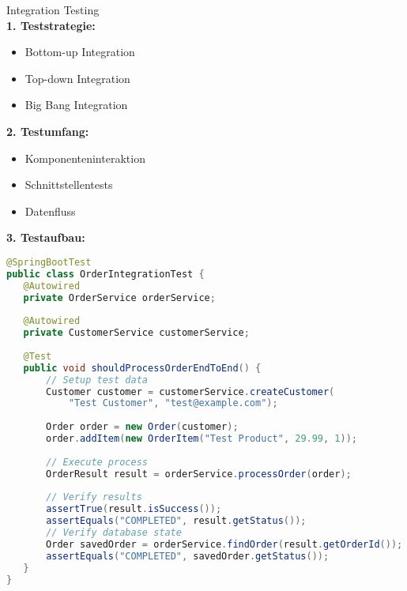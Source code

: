 \begin{KR}{Integration Testing}\\
\textbf{1. Teststrategie:}
\begin{itemize}
   \item Bottom-up Integration
   \item Top-down Integration
   \item Big Bang Integration
\end{itemize}

\textbf{2. Testumfang:}
\begin{itemize}
   \item Komponenteninteraktion
   \item Schnittstellentests
   \item Datenfluss
\end{itemize}

\textbf{3. Testaufbau:}
\begin{lstlisting}[language=Java, style=basesmol]
@SpringBootTest
public class OrderIntegrationTest {
   @Autowired
   private OrderService orderService;
   
   @Autowired
   private CustomerService customerService;
   
   @Test
   public void shouldProcessOrderEndToEnd() {
       // Setup test data
       Customer customer = customerService.createCustomer(
           "Test Customer", "test@example.com");
       
       Order order = new Order(customer);
       order.addItem(new OrderItem("Test Product", 29.99, 1));
       
       // Execute process
       OrderResult result = orderService.processOrder(order);
       
       // Verify results
       assertTrue(result.isSuccess());
       assertEquals("COMPLETED", result.getStatus());
       // Verify database state
       Order savedOrder = orderService.findOrder(result.getOrderId());
       assertEquals("COMPLETED", savedOrder.getStatus());
   }
}
\end{lstlisting}
\end{KR}

